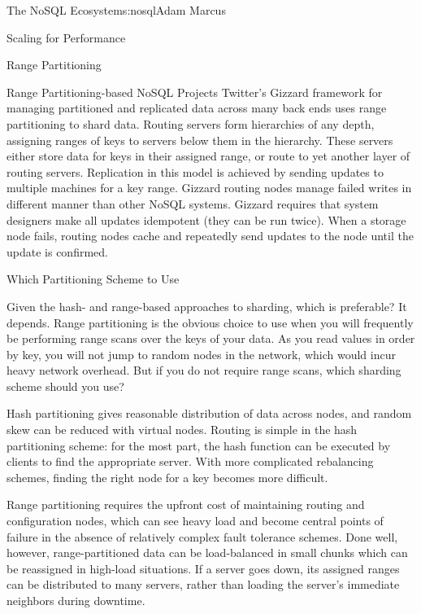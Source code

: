 \begin{aosachapter}{The NoSQL Ecosystem}{s:nosql}{Adam Marcus}
\begin{aosasect1}{Scaling for Performance}
\begin{aosasect2}{Range Partitioning}
\begin{aosasect3}{Range Partitioning-based NoSQL Projects}
Twitter's Gizzard framework for managing partitioned and replicated
data across many back ends uses range partitioning to shard data.
Routing servers form hierarchies of any depth, assigning ranges of
keys to servers below them in the hierarchy.  These servers either
store data for keys in their assigned range, or route to yet another
layer of routing servers.  Replication in this model is achieved by sending
updates to multiple machines for a key range.  Gizzard routing nodes
manage failed writes in different manner than other NoSQL systems.
Gizzard requires that system designers make all updates idempotent
(they can be run twice).  When a storage node fails, routing nodes
cache and repeatedly send updates to the node until the update is
confirmed.

\end{aosasect3}

\end{aosasect2}

\begin{aosasect2}{Which Partitioning Scheme to Use}

Given the hash- and range-based approaches to sharding, which is
preferable?  It depends.  Range partitioning is the obvious choice to
use when you will frequently be performing range scans over the keys
of your data.  As you read values in order by key, you will not jump
to random nodes in the network, which would incur heavy network
overhead.  But if you do not require range scans, which sharding
scheme should you use?

Hash partitioning gives reasonable distribution of data across nodes,
and random skew can be reduced with virtual nodes.  Routing is simple
in the hash partitioning scheme: for the most part, the hash function
can be executed by clients to find the appropriate server.  With more
complicated rebalancing schemes, finding the right node for a key
becomes more difficult.

Range partitioning requires the upfront cost of maintaining
routing and configuration nodes, which can see heavy load and become
central points of failure in the absence of relatively complex fault
tolerance schemes.  Done well, however, range-partitioned data can be
load-balanced in small chunks which can be reassigned in high-load
situations.  If a server goes down, its assigned ranges can be
distributed to many servers, rather than loading the server's
immediate neighbors during downtime.

\end{aosasect2}


\end{aosasect1}
\end{aosachapter}
